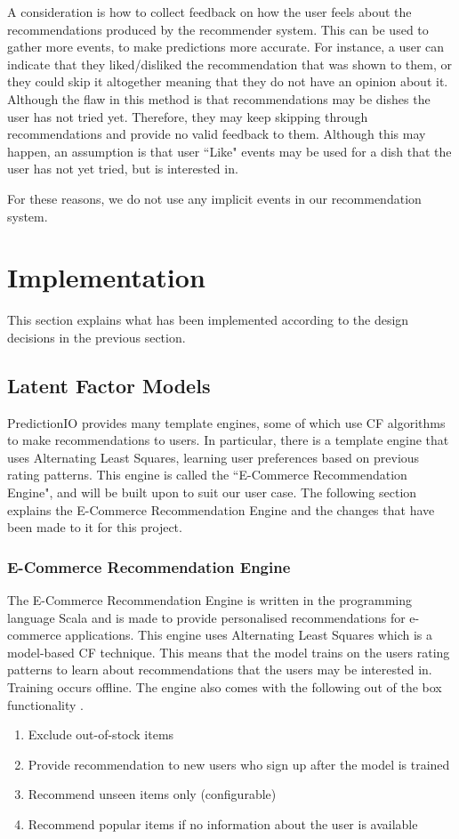 A consideration is how to collect feedback on how the user feels about the recommendations produced by the recommender system. This can be used to gather more events, to make predictions more accurate. For instance, a user can indicate that they liked/disliked the recommendation that was shown to them, or they could skip it altogether meaning that they do not have an opinion about it. Although the flaw in this method is that recommendations may be dishes the user has not tried yet. Therefore, they may keep skipping through recommendations and provide no valid feedback to them. Although this may happen, an assumption is that user ``Like" events may be used for a dish that the user has not yet tried, but is interested in. 

For these reasons, we do not use any implicit events in our recommendation system.

\section{Implementation}

This section explains what has been implemented according to the design decisions in the previous section.


\subsection{Latent Factor Models}

PredictionIO \cite{predictionio} provides many template engines, some of which use CF algorithms to make recommendations to users. In particular, there is a template engine that uses Alternating Least Squares, learning user preferences based on previous rating patterns. This engine is called the ``E-Commerce Recommendation Engine", and will be built upon to suit our user case. The following section explains the E-Commerce Recommendation Engine and the changes that have been made to it for this project. 

\subsubsection{E-Commerce Recommendation Engine}

The E-Commerce Recommendation Engine is written in the programming language Scala and is made to provide personalised recommendations for e-commerce applications. This engine uses Alternating Least Squares which is a model-based CF technique. This means that the model trains on the users rating patterns to learn about recommendations that the users may be interested in. Training occurs offline. The engine also comes with the following out of the box functionality \cite{predictionio}.
\begin{enumerate}
 \item Exclude out-of-stock items
 \item Provide recommendation to new users who sign up after the model is trained
 \item Recommend unseen items only (configurable)
 \item Recommend popular items if no information about the user is available
\end{enumerate}


